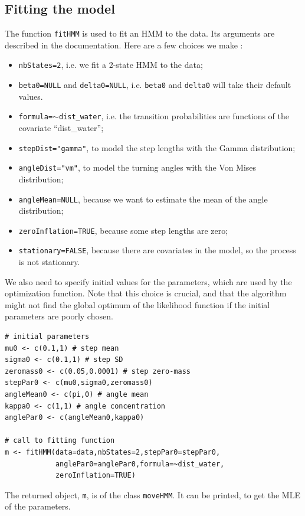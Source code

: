 \documentclass[]{article}
\begin{document}
\subsection{Fitting the model}
The function \texttt{fitHMM} is used to fit an HMM to the data. Its arguments are described in the documentation. Here are a few choices we make :
\begin{itemize}
	\item \texttt{nbStates=2}, i.e. we fit a 2-state HMM to the data;
	\item \texttt{beta0=NULL} and \texttt{delta0=NULL}, i.e. \texttt{beta0} and \texttt{delta0} will take their default values.
	\item \texttt{formula=$\sim$dist\_water}, i.e. the transition probabilities are functions of the covariate ``dist\_water'';
	\item \texttt{stepDist="gamma"}, to model the step lengths with the Gamma distribution;
	\item \texttt{angleDist="vm"}, to model the turning angles with the Von Mises distribution;
	\item \texttt{angleMean=NULL}, because we want to estimate the mean of the angle distribution;
	\item \texttt{zeroInflation=TRUE}, because some step lengths are zero;
	\item \texttt{stationary=FALSE}, because there are covariates in the model, so the process is not stationary. 
\end{itemize}

We also need to specify initial values for the parameters, which are used by the optimization function. Note that this choice is crucial, and that the algorithm might not find the global optimum of the likelihood function if the initial parameters are poorly chosen.

\begin{lstlisting}
# initial parameters
mu0 <- c(0.1,1) # step mean
sigma0 <- c(0.1,1) # step SD
zeromass0 <- c(0.05,0.0001) # step zero-mass
stepPar0 <- c(mu0,sigma0,zeromass0)
angleMean0 <- c(pi,0) # angle mean
kappa0 <- c(1,1) # angle concentration
anglePar0 <- c(angleMean0,kappa0)

# call to fitting function
m <- fitHMM(data=data,nbStates=2,stepPar0=stepPar0,
			anglePar0=anglePar0,formula=~dist_water,
			zeroInflation=TRUE)
\end{lstlisting}

The returned object, \texttt{m}, is of the class \texttt{moveHMM}. It can be printed, to get the MLE of the parameters.
\end{document}
